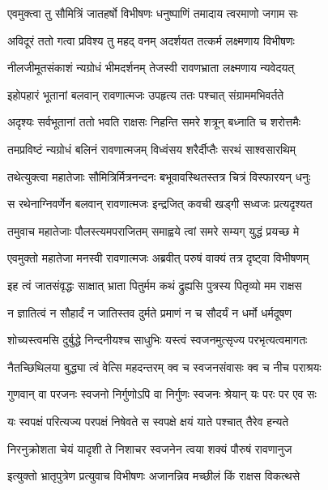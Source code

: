 
\twolineshloka
{एवमुक्त्वा तु सौमित्रिं जातहर्षो विभीषणः}
{धनुष्पाणिं तमादाय त्वरमाणो जगाम सः} %

\twolineshloka
{अविदूरं ततो गत्वा प्रविश्य तु महद् वनम्}
{अदर्शयत तत्कर्म लक्ष्मणाय विभीषणः} %

\twolineshloka
{नीलजीमूतसंकाशं न्यग्रोधं भीमदर्शनम्}
{तेजस्वी रावणभ्राता लक्ष्मणाय न्यवेदयत्} %

\twolineshloka
{इहोपहारं भूतानां बलवान् रावणात्मजः}
{उपहृत्य ततः पश्चात् संग्राममभिवर्तते} %

\twolineshloka
{अदृश्यः सर्वभूतानां ततो भवति राक्षसः}
{निहन्ति समरे शत्रून् बध्नाति च शरोत्तमैः} %

\twolineshloka
{तमप्रविष्टं न्यग्रोधं बलिनं रावणात्मजम्}
{विध्वंसय शरैर्दीप्तैः सरथं साश्वसारथिम्} %

\twolineshloka
{तथेत्युक्त्वा महातेजाः सौमित्रिर्मित्रनन्दनः}
{बभूवावस्थितस्तत्र चित्रं विस्फारयन् धनुः} %

\twolineshloka
{स रथेनाग्निवर्णेन बलवान् रावणात्मजः}
{इन्द्रजित् कवची खड्गी सध्वजः प्रत्यदृश्यत} %

\twolineshloka
{तमुवाच महातेजाः पौलस्त्यमपराजितम्}
{समाह्वये त्वां समरे सम्यग् युद्धं प्रयच्छ मे} %

\twolineshloka
{एवमुक्तो महातेजा मनस्वी रावणात्मजः}
{अब्रवीत् परुषं वाक्यं तत्र दृष्ट्वा विभीषणम्} %

\twolineshloka
{इह त्वं जातसंवृद्धः साक्षात् भ्राता पितुर्मम}
{कथं द्रुह्यसि पुत्रस्य पितृव्यो मम राक्षस} %

\twolineshloka
{न ज्ञातित्वं न सौहार्दं न जातिस्तव दुर्मते}
{प्रमाणं न च सौदर्यं न धर्मो धर्मदूषण} %

\twolineshloka
{शोच्यस्त्वमसि दुर्बुद्धे निन्दनीयश्च साधुभिः}
{यस्त्वं स्वजनमुत्सृज्य परभृत्यत्वमागतः} %

\twolineshloka
{नैतच्छिथिलया बुद्ध्या त्वं वेत्सि महदन्तरम्}
{क्व च स्वजनसंवासः क्व च नीच पराश्रयः} %

\twolineshloka
{गुणवान् वा परजनः स्वजनो निर्गुणोऽपि वा}
{निर्गुणः स्वजनः श्रेयान् यः परः पर एव सः} %

\twolineshloka
{यः स्वपक्षं परित्यज्य परपक्षं निषेवते}
{स स्वपक्षे क्षयं याते पश्चात् तैरेव हन्यते} %

\twolineshloka
{निरनुक्रोशता चेयं यादृशी ते निशाचर}
{स्वजनेन त्वया शक्यं पौरुषं रावणानुज} %

\twolineshloka
{इत्युक्तो भ्रातृपुत्रेण प्रत्युवाच विभीषणः}
{अजानन्निव मच्छीलं किं राक्षस विकत्थसे} %

